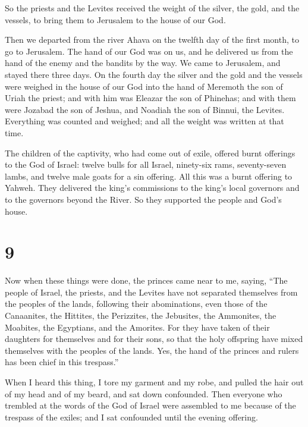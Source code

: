  So the priests and the Levites received the weight of
the silver, the gold, and the vessels, to bring them to Jerusalem to the
house of our God.

 Then we departed from the river Ahava on the twelfth day
of the first month, to go to Jerusalem. The hand of our God was on us,
and he delivered us from the hand of the enemy and the bandits by the
way.  We came to Jerusalem, and stayed there three days.
 On the fourth day the silver and the gold and the
vessels were weighed in the house of our God into the hand of Meremoth
the son of Uriah the priest; and with him was Eleazar the son of
Phinehas; and with them were Jozabad the son of Jeshua, and Noadiah the
son of Binnui, the Levites.  Everything was counted and
weighed; and all the weight was written at that time.

 The children of the captivity, who had come out of
exile, offered burnt offerings to the God of Israel: twelve bulls for
all Israel, ninety-six rams, seventy-seven lambs, and twelve male goats
for a sin offering. All this was a burnt offering to Yahweh.
 They delivered the king's commissions to the king's
local governors and to the governors beyond the River. So they supported
the people and God's house.

\hypertarget{section-8}{%
\section{9}\label{section-8}}

 Now when these things were done, the princes came near to
me, saying, ``The people of Israel, the priests, and the Levites have
not separated themselves from the peoples of the lands, following their
abominations, even those of the Canaanites, the Hittites, the
Perizzites, the Jebusites, the Ammonites, the Moabites, the Egyptians,
and the Amorites.  For they have taken of their daughters
for themselves and for their sons, so that the holy offspring have mixed
themselves with the peoples of the lands. Yes, the hand of the princes
and rulers has been chief in this trespass.''

 When I heard this thing, I tore my garment and my robe,
and pulled the hair out of my head and of my beard, and sat down
confounded.  Then everyone who trembled at the words of
the God of Israel were assembled to me because of the trespass of the
exiles; and I sat confounded until the evening offering.

